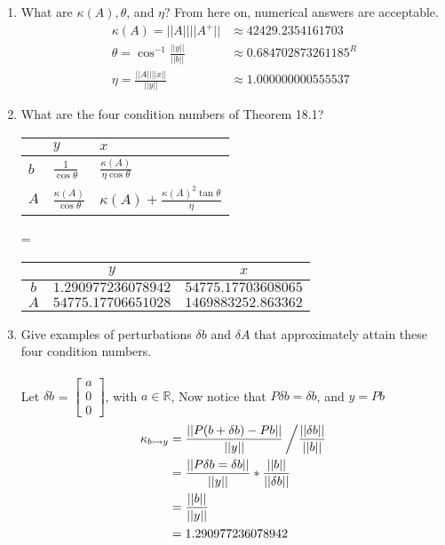 \documentclass[12pt]{article}
\begin{document}
\begin{enumerate}[label = (\alph*)]
		\item What are $\kappa(A), \theta$, and $\eta$? From here on, numerical answers are acceptable.
			\begin{align*}
				\kappa(A) = ||A|| ||A^+|| &\approx 42429.2354161703 \\
				\theta = \cos^{-1}\frac{||y||}{||b||} &\approx 0.684702873261185^R \\
				\eta = \frac{||A|| ||x||}{||y||} &\approx 1.000000000555537
			\end{align*}
		\item What are the four condition numbers of Theorem 18.1?
			\begin{center}
				\renewcommand{\arraystretch}{2}
				\begin{tabular}{ l| m{1cm}|m{3cm}|}
					& $y$ & $x$ \\
					\hline 
					$b$ & $\frac{1}{\cos \theta}$ & $\frac{\kappa(A)}{\eta \cos \theta}$ \\
					\hline
					$A$ & $\frac{\kappa(A)}{\cos \theta}$ & $\kappa(A) + \frac{\kappa(A)^2\tan \theta}{\eta}$
				\end{tabular}
				 = 
				\begin{tabular}{c|c|c|}
					& $y$ & $x$ \\
					\hline 
					$b$ & $1.290977236078942$ & $54775.17703608065$ \\
					\hline
					$A$ & $54775.17706651028$ & $1469883252.863362$
				\end{tabular}
			\end{center}
		\item  Give examples of perturbations $\delta b$ and $\delta A$ that approximately attain these
		four condition numbers. 
		\\ \\
		Let $\delta b$ =
		$
		\begin{bmatrix}
			a \\ 0 \\ 0	
		\end{bmatrix}
		$, with $a \in \mathbb{R}$, Now notice that $P\delta b = \delta b$, and $y = Pb$
			\begin{align*}
				\kappa _{b \rightarrowtail y} &= \frac{|| P(b + \delta b) - Pb ||}{|| y ||} \left/ \frac{||\delta b ||}{||b||} \right. \\
				&= \frac{|| P \delta b = \delta b ||}{|| y||} * \frac{||b||}{||\delta b ||} \\
				&= \frac{||b||}{||y||} \\
				&= 1.290977236078942
			\end{align*}

\end{enumerate}
\end{document}
